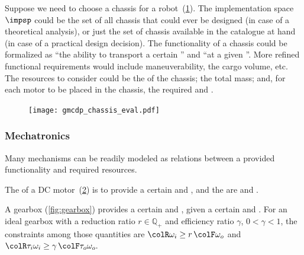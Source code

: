 \begin{example}
\label{exa:chassis}Suppose we need to choose a chassis for a robot~(\cref{fig:gmcdp_chassis_eval}).
The implementation space~$\impsp$ could be the set of all chassis
that could ever be designed (in case of a theoretical analysis), or
just the set of chassis available in the catalogue at hand (in case
of a practical design decision). The functionality of a chassis could
be formalized as ``the ability to transport a certain '' and ``at a given ''. More refined
functional requirements would include maneuverability, the cargo volume,
etc. The resources to consider could be the  of
the chassis; the total mass; and, for each motor to be placed in the
chassis, the required  and .
\end{example}
\begin{figure}[h]
    \centering
    \texttt{[image: gmcdp\_chassis\_eval.pdf]}
    \caption{\label{fig:gmcdp_chassis_eval}}
\end{figure}
 

\subsubsection{Mechatronics}


Many mechanisms can be readily modeled as relations between a provided
functionality and required resources.


\begin{example}
The  of a DC motor~(\cref{fig:dc_motor})
is to provide a certain  and , and the 
are  and .
\end{example}

\begin{figure}[h]
\begin{center}
\end{center}
\caption{\label{fig:dc_motor}}
\end{figure}


\begin{example}
A gearbox (\cref{fig:gearbox}) provides a certain  and , given a certain
 and . For
an ideal gearbox with a reduction ratio $r \in \mathbb{Q}_+$ and
efficiency ratio $\gamma$, $0<\gamma<1$, the constraints among
those quantities are ${\colR \omega_i}\geq r\,{\colF \omega_o}$
and ${\colR \tau_i\omega_i}\geq\gamma\,{\colF \tau_o\omega_o}.$
\end{example}

